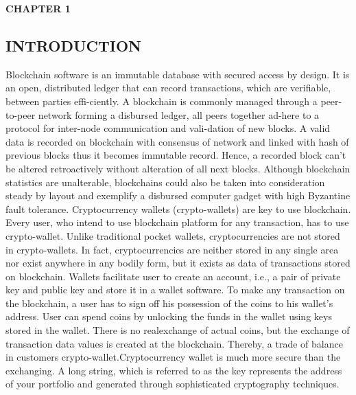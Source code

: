 \documentclass[12pt]{article}
\begin{document}
\begin{flushleft}\textbf{CHAPTER 1} \end{flushleft}
\begin{flushleft}\section{INTRODUCTION} \end{flushleft}
   Blockchain software is an immutable database with 
secured access by design. It is an open, distributed ledger 
that can record transactions, which are verifiable, between 
parties effi-ciently. A blockchain is commonly managed 
through a peer-to-peer network forming a disbursed ledger, 
all peers together ad-here to a protocol for inter-node 
communication and vali-dation of new blocks. A valid data 
is recorded on blockchain with consensus of network and 
linked with hash of previous blocks thus it becomes 
immutable record. Hence, a recorded block can’t be altered 
retroactively without alteration of all next blocks. Although 
blockchain statistics are unalterable, blockchains could also 
be taken into consideration steady by layout and exemplify a 
disbursed computer gadget with high Byzantine fault 
tolerance. Cryptocurrency wallets (crypto-wallets) are key to use 
blockchain. Every user, who intend to use blockchain 
platform for any transaction, has to use crypto-wallet. 
Unlike traditional pocket wallets, cryptocurrencies are not 
stored in crypto-wallets. In fact, cryptocurrencies are neither 
stored in any single area nor exist anywhere in any bodily 
form, but it exists as data of transactions stored on 
blockchain. Wallets facilitate user to create an account, i.e., 
a pair of private key and public key and store it in a wallet 
software. To make any transaction on the blockchain, a user 
has to sign off his possession of the coins to his wallet’s 
address. User can spend coins by unlocking the funds in the 
wallet using keys stored in the wallet. There is no realexchange of actual coins, but the exchange of transaction 
data values is created at the blockchain. Thereby, a trade of 
balance in customers crypto-wallet.Cryptocurrency wallet is much more secure than the 
exchanging. A long string, which is referred to as the key 
represents the address of your portfolio and generated 
through sophisticated cryptography techniques. 
\end{document}

